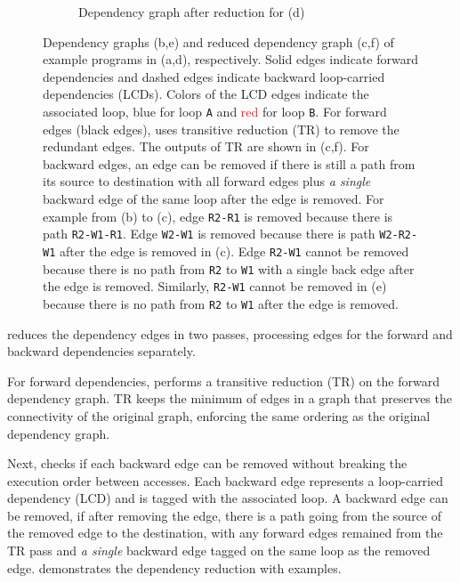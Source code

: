 \begin{figure}
\begin{subfigure}[b]{0.3\textwidth}
\caption{
  Dependency graph after reduction for (d)
}
\end{subfigure}
\caption[Dependency graph reduction]{
  Dependency graphs (b,e) and reduced dependency graph (c,f) of example programs in (a,d),
  respectively.
  Solid edges indicate forward dependencies and
  dashed edges indicate backward loop-carried dependencies (LCDs).
  Colors of the LCD edges indicate the associated loop, \textcolor{pureblue}{blue} for loop \texttt{A} and
  \textcolor{red}{red} for loop \texttt{B}.
  For forward edges (black edges), \name uses transitive reduction (TR) to remove the redundant
  edges. The outputs of TR are shown in (c,f).
  For backward edges, an edge can be removed if there is still a path from its source to
  destination with all forward edges plus \emph{a single} backward edge of the same loop after the edge is
  removed.
  For example from (b) to (c), edge \texttt{R2-R1} is removed because there is path \texttt{R2-W1-R1}.
  Edge \texttt{W2-W1} is removed because there is path \texttt{W2-R2-W1} after the edge is removed in (c). 
  Edge \texttt{R2-W1} cannot be removed because there is no path from \texttt{R2} to \texttt{W1} with a
  single back edge after the edge is removed.
  Similarly, \texttt{R2-W1} cannot be
  removed in (e) because there is no path from \texttt{R2} to \texttt{W1} after the edge is removed.
}
\label{fig:graphred}
\end{figure}

\name reduces the dependency edges in two passes, processing edges for the forward and backward dependencies separately.

For forward dependencies, \name performs a transitive reduction (TR)\cite{tr} on the forward dependency
graph. TR keeps the minimum of edges in a graph that preserves the connectivity of the original
graph, enforcing the same ordering as the original dependency graph.

Next, \name checks if each backward edge can be removed without breaking the execution order between
accesses. 
Each backward edge represents a loop-carried dependency (LCD) and is tagged with the associated loop.
A backward edge can be removed, if after removing the edge, there is a path going from the source of the removed edge to the
destination, with any forward edges remained from the TR pass and 
\emph{a single} backward edge tagged on the same loop as the removed edge.
 demonstrates the dependency reduction with examples.

